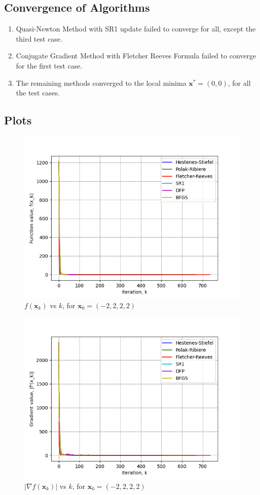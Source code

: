 \documentclass[a4paper]{article}
\begin{document}
\subsection{Convergence of Algorithms}

\begin{enumerate}

\item Quasi-Newton Method with SR1 update failed to converge for all, except the third test case.

\item Conjugate Gradient Method with Fletcher Reeves Formula failed to converge for the first test case.

\item The remaining methods converged to the local minima $\textbf{x}^* = (0, 0)$, for all the test cases.

\end{enumerate}

\subsection{Plots}

\begin{figure}[H]
    \centering
    \includegraphics[width=.65\textwidth]{rosenbrock_function_vals.png}
    \caption{$f(\textbf{x}_k)$ vs $k$, for $\textbf{x}_0 = (-2, 2, 2, 2)$}
\end{figure}

\begin{figure}[H]
    \centering
    \includegraphics[width=.65\textwidth]{rosenbrock_function_grad.png}
    \caption{$|\nabla f(\textbf{x}_k)|$ vs $k$, for $\textbf{x}_0 = (-2, 2, 2, 2)$}
\end{figure}
\end{document}
